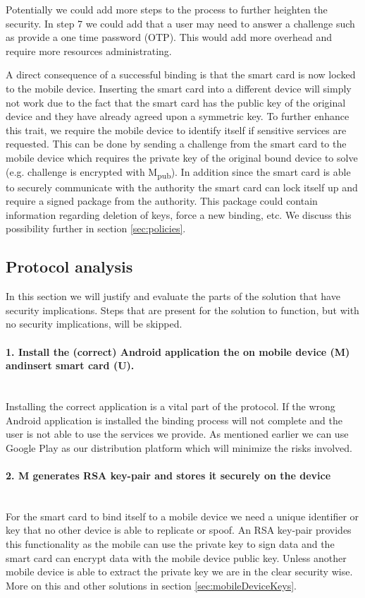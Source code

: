 Potentially we could add more steps to the process to further heighten the security. In step 7 we could add that a user may need to answer a challenge such as provide a one time password (OTP). This would add more overhead and require more resources administrating.

A direct consequence of a successful binding is that the smart card is now locked to the mobile device. Inserting the smart card into a different device will simply not work due to the fact that the smart card has the public key of the original device and they have already agreed upon a symmetric key. To further enhance this trait, we require the mobile device to identify itself if sensitive services are requested. This can be done by sending a challenge from the smart card to the mobile device which requires the private key of the original bound device to solve (e.g. challenge is encrypted with M\textsubscript{pub}). In addition since the smart card is able to securely communicate with the authority the smart card can lock itself up and require a signed package from the authority. This package could contain information regarding deletion of keys, force a new binding, etc. We discuss this possibility further in section \ref{sec:policies}.

\subsection{Protocol analysis}
In this section we will justify and evaluate the parts of the solution that have security implications. Steps that are present for the solution to function, but with no security implications, will be skipped.

\paragraph{1. Install the (correct) Android application the on mobile device (M) andinsert smart card (U).}\mbox{}\\
Installing the correct application is a vital part of the protocol. If the wrong Android application is installed the binding process will not complete and the user is not able to use the services we provide. As mentioned earlier we can use Google Play as our distribution platform which will minimize the risks involved.

\paragraph{2. M generates RSA key-pair and stores it securely on the device}\mbox{}\\
For the smart card to bind itself to a mobile device we need a unique identifier or key that no other device is able to replicate or spoof. An RSA key-pair provides this functionality as the mobile can use the private key to sign data and the smart card can encrypt data with the mobile device public key. Unless another mobile device is able to extract the private key we are in the clear security wise. More on this and other solutions in section \ref{sec:mobileDeviceKeys}.

